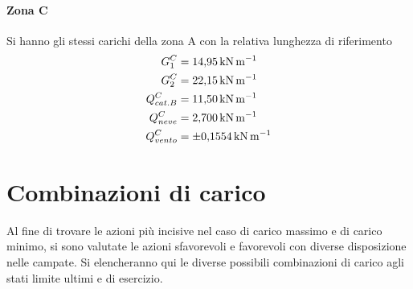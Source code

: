 \paragraph*{Zona C} Si hanno gli stessi carichi della zona A con la relativa lunghezza di riferimento
\begin{align*}
G_1^C &= \SI{14.95}{\kilo\newton\per\meter}\\
G_2^C &= \SI{22.15}{\kilo\newton\per\meter}\\
Q_{cat. B}^C &=  \SI{11.50}{\kilo\newton\per\meter}\\
Q_{neve}^C &= \SI{2.700}{\kilo\newton\per\meter}\\
Q_{vento}^C &= \SI{\pm 0.1554}{\kilo\newton\per\meter}
\end{align*}
\section{Combinazioni di carico}\label{cap:combinazioniCarico}
Al fine di trovare le azioni più incisive nel caso di carico massimo e di carico minimo, si sono valutate le azioni sfavorevoli e favorevoli con diverse disposizione nelle campate. 
Si elencheranno qui le diverse possibili combinazioni di carico agli stati limite ultimi e di esercizio.
